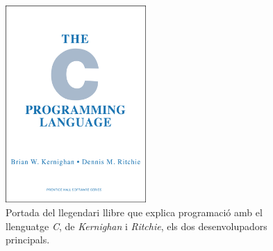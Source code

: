 \begin{figure}[ht!]
\centering
\includegraphics[height=75mm]{data/clang.png}
\caption{Portada del llegendari llibre que explica programació amb el llenguatge \emph{C}, de \emph{Kernighan} i \emph{Ritchie}, els dos desenvolupadors principals.}
\label{websshare}
\end{figure}